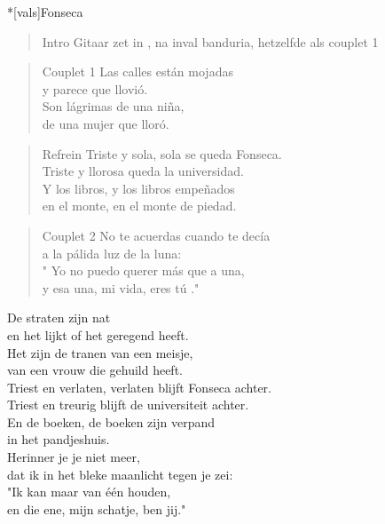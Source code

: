\begin{song}*[vals]{Fonseca}

\begin{verse}{Intro}
Gitaar zet in , na inval banduria, hetzelfde als couplet 1
\end{verse}
\begin{verse}{Couplet 1}
Las calles están mojadas\\
y parece que llovió.\\
Son lágrimas de una niña,\\
de una mujer que lloró.\\
\end{verse}

\begin{verse}{Refrein}
Triste y sola, sola se queda Fonseca.\\
Triste y llorosa queda la universidad.\\
Y los libros, y los libros empeñados\\
en el monte, en el monte de piedad.\\
\end{verse}

\begin{verse}{Couplet 2}
No te acuerdas cuando te decía\\
a la pálida luz de la luna:\\
\chord{}" Yo no puedo querer más que a una,\\
y esa una, mi vida, eres tú ."\\
\end{verse}

\end{song}
\begin{translation}
De straten zijn nat\\
en het lijkt of het geregend heeft.\\
Het zijn de tranen van een meisje,\\
van een vrouw die gehuild heeft.\\\vspace{1em}
Triest en verlaten, verlaten blijft Fonseca achter.\\
Triest en treurig blijft de universiteit achter.\\
En de boeken, de boeken zijn verpand\\
in het pandjeshuis.\\\vspace{1em}
Herinner je je niet meer,\\
dat ik in het bleke maanlicht tegen je zei:\\
"\hspace{0.1em}Ik kan maar van één houden,\\
en die ene, mijn schatje, ben jij."\\
\end{translation}
